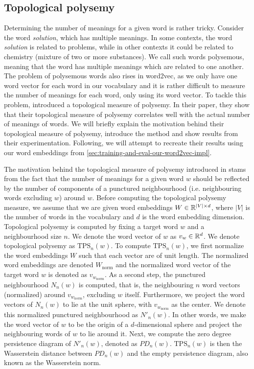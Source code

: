 \subsection{Topological polysemy}
Determining the number of meanings for a given word is rather tricky. Consider the word \textit{solution}, which has multiple meanings. In some contexts, the word \textit{solution} is related to problems, while in other contexts it could be related to chemistry (mixture of two or more substances). We call such words polysemous, meaning that the word has multiple meanings which are related to one another. The problem of polysemous words also rises in word2vec, as we only have one word vector for each word in our vocabulary and it is rather difficult to measure the number of meanings for each word, only using its word vector. To tackle this problem, \cite{jakubowski2020topology} introduced a topological measure of polysemy. In their paper, they show that their topological measure of polysemy correlates well with the actual number of meanings of words. We will briefly explain the motivation behind their topological measure of polysemy, introduce the method and show results from their experimentation. Following, we will attempt to recreate their results using our word embeddings from \cref{sec:training-and-eval-our-word2vec-impl}.

The motivation behind the topological measure of polysemy introduced in \cite{jakubowski2020topology} stams from the fact that the number of meanings for a given word $w$ should be reflected by the number of components of a punctured neighbourhood (i.e. neighbouring words excluding $w$) around $w$. Before computing the topological polysemy measure, we assume that we are given word embeddings $W \in \mathbb{R}^{|V| \times d}$, where $|V|$ is the number of words in the vocabulary and $d$ is the word embedding dimension. Topological polysemy is computed by fixing a target word $w$ and a neighbourhood size $n$. We denote the word vector of $w$ as $v_w \in \mathbb{R}^{d}$. We denote topological polysemy as $\text{TPS}_n(w)$. To compute $\text{TPS}_n(w)$, we first normalize the word embeddings $W$ such that each vector are of unit length. The normalized word embeddings are denoted $W_\text{norm}$ and the normalized word vector of the target word $w$ is denoted as $v_{w_{\text{norm}}}$. As a second step, the punctured neighbourhood $N_n(w)$ is computed, that is, the neighbouring $n$ word vectors (normalized) around $v_{w_{\text{norm}}}$, excluding $w$ itself. Furthermore, we project the word vectors of $N_n(w)$ to lie at the unit sphere, with $v_{w_{\text{norm}}}$ as the center. We denote this normalized punctured neighbourhood as $N'_n(w)$. In other words, we make the word vector of $w$ to be the origin of a $d$-dimensional sphere and project the neighbouring words of $w$ to lie around it. Next, we compute the zero degree persistence diagram of $N'_n(w)$, denoted as $PD_n(w)$. $\text{TPS}_n(w)$ is then the Wasserstein distance between $PD_n(w)$ and the empty persistence diagram, also known as the Wasserstein norm.

